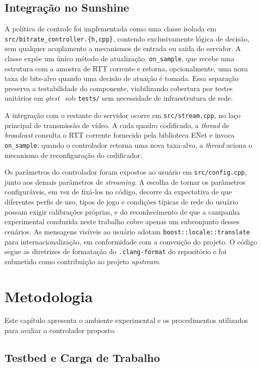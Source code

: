 \documentclass[conference]{IEEEtran}
\begin{document}
\subsection{Integração no Sunshine}

A política de controle foi implementada como uma classe
isolada em \texttt{src/bitrate\_controller.\{h,cpp\}}, contendo
exclusivamente lógica de decisão, sem qualquer acoplamento a
mecanismos de entrada ou saída do servidor. A classe expõe um
único método de atualização, \texttt{on\_sample}, que recebe
uma estrutura com a amostra de RTT corrente e retorna,
opcionalmente, uma nova taxa de bits-alvo quando uma decisão
de atuação é tomada. Essa separação preserva a testabilidade
do componente, viabilizando cobertura por testes unitários em
\emph{gtest}~\cite{gtest} sob \texttt{tests/} sem necessidade de
infraestrutura de rede.

A integração com o restante do servidor ocorre em
\texttt{src/stream.cpp}, no laço principal de transmissão de
vídeo. A cada quadro codificado, a \emph{thread} de
\emph{broadcast} consulta o RTT corrente fornecido pela
biblioteca ENet e invoca \texttt{on\_sample}; quando o
controlador retorna uma nova taxa-alvo, a \emph{thread} aciona
o mecanismo de reconfiguração do codificador.

Os parâmetros do controlador foram expostos ao usuário em
\texttt{src/config.cpp}, junto aos demais parâmetros de
\emph{streaming}. A escolha de tornar os parâmetros
configuráveis, em vez de fixá-los no código, decorre da
expectativa de que diferentes perfis de uso, tipos de jogo e
condições típicas de rede do usuário possam exigir calibrações
próprias, e do reconhecimento de que a campanha
experimental conduzida neste trabalho cobre apenas um
subconjunto desses cenários. As mensagens visíveis ao usuário
adotam \texttt{boost::locale::translate} para internacionalização,
em conformidade com a convenção do projeto. O código segue as
diretrizes de formatação do \texttt{.clang-format} do
repositório e foi submetido como contribuição ao projeto
\emph{upstream}.


\section{Metodologia}\label{sec:metodologia}

Este capítulo apresenta o ambiente experimental e os procedimentos utilizados para avaliar o controlador proposto.

\subsection{Testbed e Carga de Trabalho}
\end{document}
